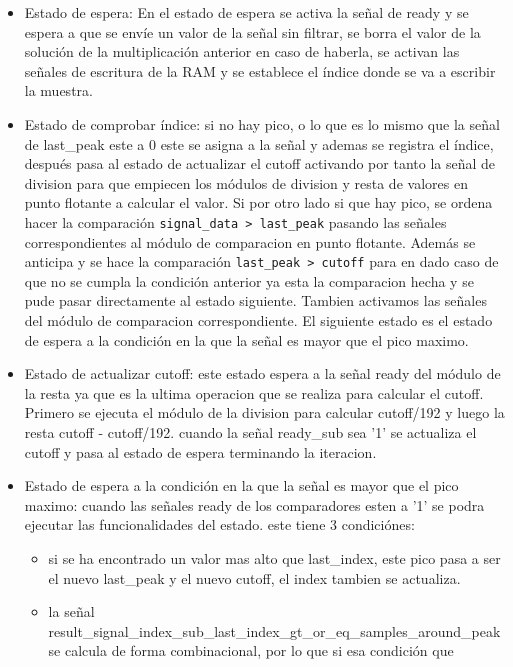 \begin{itemize}
    \item Estado de espera: En el estado de espera se activa la señal de ready y se espera a que se envíe un valor de la
    señal sin filtrar, se borra el valor de la solución de la multiplicación anterior en caso de haberla, se activan las
    señales de escritura de la RAM y se establece el índice donde se va a escribir la muestra.
    \item Estado de comprobar índice: si no hay pico, o lo que es lo mismo que la señal de last\_peak este a 0 este se asigna
     a la señal y ademas se registra el índice, después pasa al estado de actualizar el cutoff activando por tanto la señal de 
     division para que empiecen los módulos de division y resta de valores en punto flotante a calcular el valor. Si por otro
     lado si que hay pico, se ordena hacer la comparación \lstinline{signal_data > last_peak} pasando las señales correspondientes al módulo de comparacion en 
     punto flotante. Además se anticipa y se hace la comparación \lstinline{last_peak > cutoff} para en dado caso de que no se cumpla la 
     condición anterior ya esta la comparacion hecha y se pude pasar directamente al estado siguiente. Tambien activamos las señales
     del módulo de comparacion correspondiente. El siguiente estado es el estado de espera a la condición en la que la señal es mayor 
     que el pico maximo.
    \item Estado de actualizar cutoff: este estado espera a la señal ready del módulo de la resta ya que es la ultima operacion que se realiza para 
    calcular el cutoff. Primero se ejecuta el módulo de la division para calcular cutoff/192 y luego la resta cutoff - cutoff/192. cuando la señal
    ready\_sub sea '1' se actualiza el cutoff y pasa al estado de espera terminando la iteracion. 
    \item Estado de espera a la condición en la que la señal es mayor que el pico maximo: cuando las señales ready de los comparadores esten a '1' 
    se podra ejecutar las funcionalidades del estado. este tiene 3 condiciónes:
    \begin{itemize}
        \item si se ha encontrado un valor mas alto que last\_index, este pico pasa a ser el nuevo last\_peak y el nuevo cutoff, el index tambien se actualiza. 
        \item la señal result\_signal\_index\_sub\_last\_index\_gt\_or\_eq\_samples\_around\_peak se calcula de forma combinacional, por lo que si esa condición que

\end{itemize}
\end{itemize}

